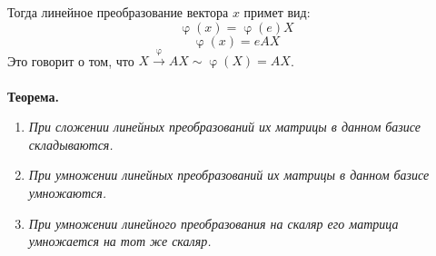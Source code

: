 \documentclass[a4paper, 12pt]{article}
\renewcommand{\varphi}{\upvarphi}
\begin{document}
Тогда линейное преобразование вектора $x$ примет вид:
$$\varphi(x)=\varphi(e)X$$
$$\varphi(x)=eAX$$
Это говорит о том, что $X \xrightarrow{\varphi} AX \sim \varphi(X)=AX$.\\\\
\textbf{Теорема.}
    \begin{enumerate}
        \item \textit{При сложении линейных преобразований их матрицы в данном базисе складываются.}
        \item \textit{При умножении линейных преобразований их матрицы в данном базисе умножаются.}
        \item \textit{При умножении линейного преобразования на скаляр его матрица умножается на тот же скаляр.}
    \end{enumerate}
\end{document}
